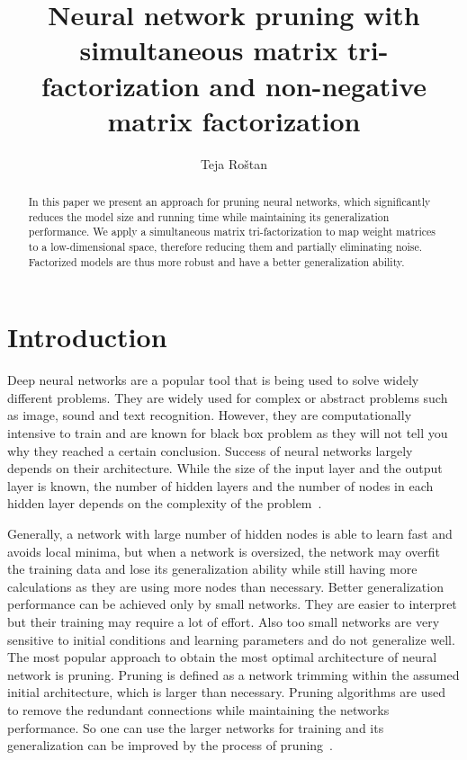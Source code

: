 \documentclass{article} %
\title{Neural network pruning with simultaneous matrix tri-factorization and non-negative matrix factorization}
\author{Teja Ro\v{s}tan}
\begin{document}
\maketitle

\begin{abstract}

In this paper we present an approach for pruning neural networks, which
significantly reduces the model size and running time while maintaining its 
generalization performance. We apply a simultaneous matrix tri-factorization 
to map weight matrices to a low-dimensional space, therefore reducing them 
and partially eliminating noise. Factorized models are thus more robust and 
have a better generalization ability.

\end{abstract}

\section{Introduction}

Deep neural networks are a popular tool that is being used to solve widely
different problems. They are widely used for complex or abstract problems 
such as image,
sound and text recognition. However, they are computationally intensive to
train and are known for black box problem as they will not tell you why they
reached a certain conclusion. Success of neural networks largely depends on
their architecture. While the size of the input layer and the output layer is
known, the number of hidden layers and the number of nodes in each hidden layer
depends on the complexity of the problem~\cite{augasta2013pruning}. 

Generally,
a network with large number of hidden nodes is able to learn fast and avoids
local minima, but when a network is oversized, the network may overfit the
training data and lose its generalization ability while still having
more calculations as they are using more nodes than necessary. Better
generalization performance can be achieved only by small networks. They are
easier to interpret but their training may require a lot of effort. Also too
small networks are very sensitive to initial conditions and learning parameters
and do not generalize well. The most popular approach to
obtain the most optimal architecture of neural network is pruning. Pruning is
defined as a network trimming within the assumed initial architecture, which is
larger than necessary. Pruning algorithms are used to remove the redundant
connections while maintaining the networks performance. So one can use the
larger networks for training and its generalization can be improved by the
process of pruning~\cite{augasta2013pruning}.
\end{document}
